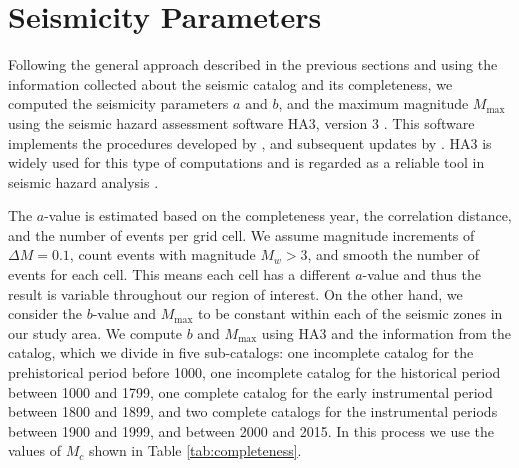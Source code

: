 
\section{Seismicity Parameters}
\label{sec:params}

Following the general approach described in the previous sections and using the information collected about the seismic catalog and its completeness, we computed the seismicity parameters $a$ and $b$, and the maximum magnitude $M_{\max}$ using the seismic hazard assessment software HA3, version 3 \citep{Kijko_2004_HA3}. This software implements the procedures developed by \citet{Kijko_1989_BSSA, Kijko_1992_BSSA}, and subsequent updates by \citet{Kijko_2004_PAG}. HA3 is widely used for this type of computations and is regarded as a reliable tool in seismic hazard analysis \citep[see, for instance,][]{Karimiparidari2013, Khodaverdian_2016_BSSA}.

The $a$-value is estimated based on the completeness year, the correlation distance, and the number of events per grid cell. We assume magnitude increments of $\Delta M = 0.1$, count events with magnitude $M_w > 3$, and smooth the number of events for each cell. This means each cell has a different $a$-value and thus the result is variable throughout our region of interest. On the other hand, we consider the $b$-value and $M_{\max}$ to be constant within each of the seismic zones in our study area. We compute $b$ and $M_{\max}$ using HA3 and the information from the catalog, which we divide in five sub-catalogs: one incomplete catalog for the prehistorical period before 1000, one incomplete catalog for the historical period between 1000 and 1799, one complete catalog for the early instrumental period between 1800 and 1899, and two complete catalogs for the instrumental periods between 1900 and 1999, and between 2000 and 2015. In this process we use the values of $M_c$ shown in Table \ref{tab:completeness}. 

